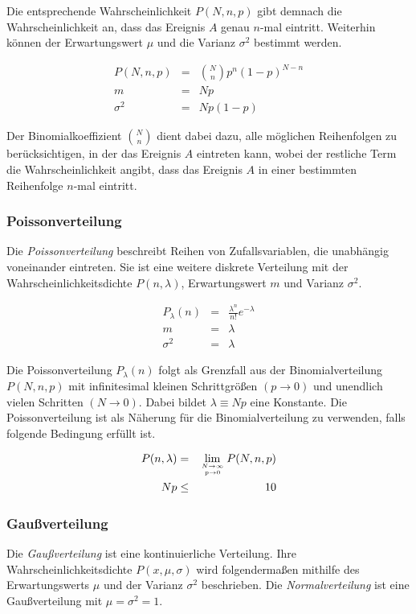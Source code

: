 \documentclass[12pt,a4paper]{scrartcl}
\numberwithin{equation}{section} %
\renewcommand{\[}{} %
\renewcommand{\]}{\noindent} %
\begin{document}
Die entsprechende  Wahrscheinlichkeit $P(N,n,p)$ gibt demnach die Wahrscheinlichkeit an, dass das Ereignis $A$ genau $n$-mal eintritt. Weiterhin können der Erwartungswert $\mu$ und die Varianz $\sigma^2$ bestimmt werden.

\begin{eqnarray}
	P(N,n,p) &=& \binom{N}{n} p^n (1-p)^{N-n} \\
	m &=& Np \\
	\sigma^2 &=& N p (1-p)
\end{eqnarray}

\noindent
Der Binomialkoeffizient $\binom{N}{n}$ dient dabei dazu, alle möglichen Reihenfolgen zu berücksichtigen, in der das Ereignis $A$ eintreten kann, wobei der restliche Term die Wahrscheinlichkeit angibt, dass das Ereignis $A$ in einer bestimmten Reihenfolge $n$-mal eintritt.

\subsubsection{Poissonverteilung}
\label{Poissonverteilung}
Die \emph{Poissonverteilung} beschreibt Reihen von Zufallsvariablen, die unabhängig voneinander eintreten. Sie ist eine weitere diskrete Verteilung mit der Wahrscheinlichkeitsdichte $P(n,\lambda)$, Erwartungswert $m$ und Varianz $\sigma^2$.

\begin{eqnarray}
	P_\lambda(n) &=& \frac{\lambda^n}{n!} e^{-\lambda}
	\label{eq:poisson} \\
	m &=& \lambda \\
	\sigma^2 &=& \lambda
\end{eqnarray}

\noindent
Die Poissonverteilung $P_\lambda(n)$ folgt als Grenzfall aus der Binomialverteilung $P(N, n, p)$ mit infinitesimal kleinen Schrittgrößen $(p\rightarrow 0)$ und unendlich vielen Schritten $(N\rightarrow 0)$. Dabei bildet $\lambda\equiv Np$ eine Konstante. Die Poissonverteilung ist als Näherung für die Binomialverteilung zu verwenden, falls folgende Bedingung erfüllt ist.

\begin{eqnarray}
	P(n, \lambda)  &=& \lim_{N \rightarrow \infty \atop p\rightarrow 0} P(N, n, p) \\
	N p &\leq& 10
\end{eqnarray}

\subsubsection{Gaußverteilung}
\label{Gaußverteilung}
Die \emph{Gaußverteilung} ist eine kontinuierliche Verteilung. Ihre Wahrscheinlichkeitsdichte $P(x,\mu,\sigma)$ wird folgendermaßen mithilfe des Erwartungswerts $\mu$ und der Varianz $\sigma^2$ beschrieben. Die \emph{Normalverteilung}  ist eine Gaußverteilung mit $\mu=\sigma^2=1$.
\end{document}
